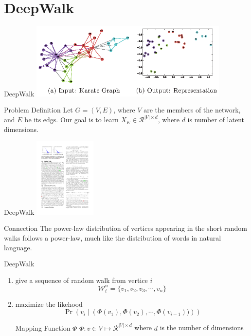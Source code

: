 \documentclass{beamer}
\begin{document}
\section{DeepWalk}
\begin{frame}{DeepWalk}
    \centering\includegraphics[height=3.8cm]{DeepWalk_1.eps}
    \begin{definition}{Problem Definition}
        Let $G = \left( V ,E \right)$, where $V$ are the members of the network, and $E$ be its edgs.
        Our goal is to learn $X_E\in \mathcal{R} ^{|V|\times d}$, where $d$ is number of 
        latent dimensions.
    \end{definition}
\end{frame}
\begin{frame}{DeepWalk}
    \centering\includegraphics[height=4cm]{DeepWalk_2.pdf}
    \begin{alertblock}{Connection}
        The power-law distribution of vertices appearing in the short random walks follows 
        a power-law, much like the distribution of words in natural language.
    \end{alertblock}
\end{frame}
\begin{frame}{DeepWalk}
    \begin{enumerate}
        \item give a sequence of random walk from vertice $i$
            \begin{equation}
                \mathcal{W}_{i}^{n}  = \{v_1, v_2, v_3, \cdots , v_n\}
            \end{equation}
        \item maximize the likehood
            \begin{equation}
                \operatorname{Pr}\left(v_i \mid \left(\Phi(v_1), \Phi(v_2), \cdots, \Phi(v_{i-1}))\right)\right)
            \end{equation}
            \begin{block}{Mapping Function $\Phi$}
                $\Phi: v \in V \longmapsto \mathcal{R}^{|V|\times d}$
                where $d$ is the number of dimensions                
            \end{block}
    \end{enumerate}
\end{frame}
\end{document}
